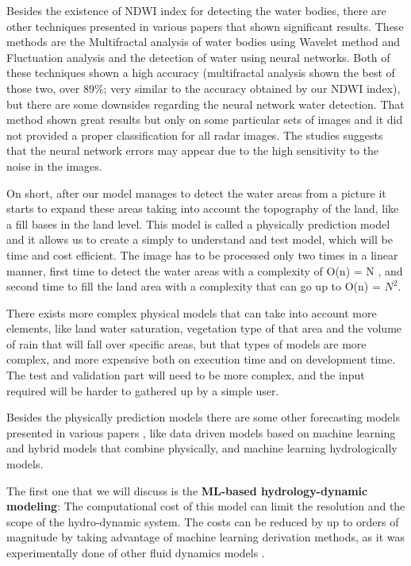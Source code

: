 \documentclass[12pt, a4paper]{report}
\begin{document}
Besides the existence of NDWI index for detecting the water bodies, there are other techniques presented in various papers \cite{Multifractal water analysis, NDWI Comparison} that shown significant results. These methods are the Multifractal analysis of water bodies using Wavelet method and Fluctuation analysis and the detection of water using neural networks. Both of these techniques shown a high accuracy (multifractal analysis shown the best of those two, over 89\%; very similar to the accuracy obtained by our NDWI index), but there are some downsides regarding the neural network water detection. That method shown great results but only on some particular sets of images and it did not provided a proper classification for all radar images. The studies \cite{NDWI Comparison} suggests that the neural network errors may appear due to the high sensitivity to the noise in the images. 
\par 

On short, after our model manages to detect the water areas from a picture it starts to expand these areas taking into account the topography of the land, like a fill bases in the land level. This model is called a physically prediction model and it allows us to create a simply to understand and test model, which will be time and cost efficient. The image has to be processed only two times in a linear manner, first time to detect the water areas with a complexity of O(n) = N , and second time to fill the land area with a complexity that can go up to O(n) = $N^2$. 
\par 

There exists more complex physical models that can take into account more elements, like land water saturation, vegetation type of that area and the volume of rain that will fall over specific areas, but that types of models are more complex, and more expensive both on execution time and on development time. The test and validation part will need to be more complex, and the input required will be harder to gathered up by a simple user. 
\par 

Besides the physically prediction models there are some other forecasting models presented in various papers \cite{Flood forecasting models}, like data driven models based on machine learning and hybrid models that combine physically, and machine learning hydrologically models.\par 

The first one that we will discuss is the \textbf{ML-based hydrology-dynamic modeling}: The computational cost of this model can limit the resolution and the scope of the hydro-dynamic system. The costs can be reduced by up to orders of magnitude by taking advantage of machine learning derivation methods, as it was experimentally done of other fluid dynamics models \cite{Yohai}.
\par 
\end{document}
